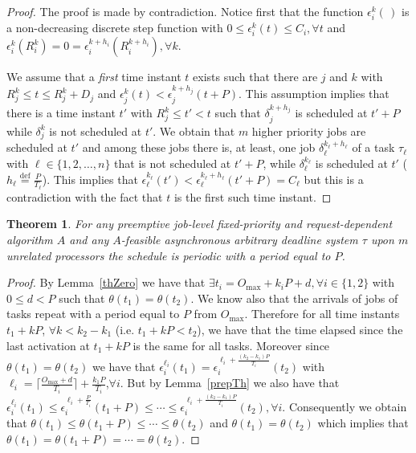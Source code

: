 \documentclass[a4paper,11pt]{article}
\newtheorem{Theorem}{Theorem}
\newcommand{\equals}{\stackrel{\mathrm{def}}{=}}
\newcommand{\maxm}{\mathrm{max}}
\begin{document}
\begin{proof}
  The proof is made by contradiction. Notice first that the function
  $\epsilon_i^k(\,)$ is a non-decreasing discrete step function with $0
  \leq \epsilon_i^k(t) \leq C_i, \forall t$ and $\epsilon_i^k(R_i^k)=0=
  \epsilon_i^{k+h_i}(R_i^{k+h_i}), \forall k$.

  We assume that a \emph{first} time instant $t$ exists such that there are
  $j$ and $k$ with $R_j^k \leq t \leq R_j^k+D_j$ and
  $\epsilon_{j}^{k}(t) < \epsilon_{j}^{k+h_j}(t+P)$. This assumption
  implies that there is a time instant $t'$ with $R_j^{k} \leq t' < t$
  such that $\delta_j^{k+h_j}$ is scheduled at $t'+P$ while
  $\delta_j^k$ is not scheduled at $t'$. We obtain that $m$ higher priority jobs are scheduled at $t'$ and among these jobs there is, at least, one
  job $\delta_{{\ell}}^{k_{\ell}+h_{\ell}}$ of a task $\tau_{{\ell}}$ with
  ${\ell} \in \{1, 2, \ldots, n \}$ that is not
  scheduled at $t'+P$, while $\delta_{{\ell}}^{k_{\ell}}$
  is scheduled at $t'$ ($h_{\ell}\equals\frac{P}{T_{\ell}}$). This implies
  that $\epsilon_{{\ell}}^{k_{\ell}}(t') <
  \epsilon_{{\ell}}^{k_{\ell}+h_{\ell}}(t'+P)=C_{{\ell}}$
  but this is a contradiction with the fact that $t$ is the first such
  time instant.
\end{proof}

\begin{Theorem}\label{perGen} 
For any preemptive job-level fixed-priority and request-dependent algorithm $A$ and any $A$-feasible asynchronous arbitrary deadline system $\tau$ 
upon $m$ unrelated processors the schedule is periodic with a period equal to $P$. 
\end{Theorem}

\begin{proof}
  By Lemma~\ref{thZero} we have that $\exists t_i= O_{\maxm}+k_iP+d,
  \forall i \in \{1,2 \}$ with $0 \leq d < P$ such that
  $\theta(t_1)=\theta(t_2)$. We know also that the arrivals of jobs of
  tasks repeat with a period equal to $P$ from $O_{\maxm}$. Therefore
  for all time instants $t_1+kP$, $\forall k < k_2-k_1$ (i.e. $t_1+kP<
  t_2$), we have that the time elapsed since the last activation at
  $t_1+kP$ is the same for all tasks. Moreover
  since $\theta(t_1)=\theta(t_2)$ we have that
  $\epsilon_{i}^{{\ell}_i}(t_1)=\epsilon_{i}^{{\ell}_i+\frac{(k_2-k_1)P}{T_i}}(t_2)$
  with ${\ell}_i =\lceil \frac{O_{\maxm}+d}{T_i} \rceil +
  \frac{k_1P}{T_i}$,$\forall i$. But by Lemma~\ref{prepTh} we also
  have that $\epsilon_{i}^{{\ell}_i}(t_1) \leq
  \epsilon_{i}^{{\ell}_i+\frac{P}{T_i}}(t_1+P) \leq \cdots \leq
  \epsilon_{i}^{{\ell}_i+\frac{(k_2-k_1)P}{T_i}}(t_2), \forall
  i$. Consequently we obtain that $\theta(t_1) \leq \theta(t_1+P) \leq
  \cdots \leq \theta(t_2)$ and $\theta(t_1)=\theta(t_2)$ which implies
  that $\theta(t_1) = \theta(t_1+P) = \cdots = \theta(t_2)$. 
\end{proof}
\end{document}
